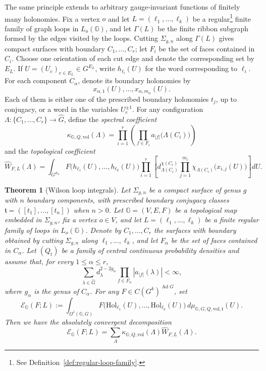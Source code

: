 \documentclass[11pt,a4paper,reqno]{article}
\newtheorem{theorem}{Theorem}[section]
\theoremstyle{definition}
\theoremstyle{remark}
\newcommand\vol{\mathrm{vol}}
\newcommand\Gbb{{\mathbb{G}}}
\newcommand\Hol{{\mathrm{Hol}}}
\begin{document}
The same principle extends to arbitrary gauge-invariant functions of finitely many holonomies. Fix a vertex $o$ and let $L=(\ell_1,\ldots,\ell_k)$ be a regular\footnote{See Definition~\ref{def:regular-loop-family}.} finite family of graph loops in $L_o(\Gbb)$, and let $\Gamma(L)$ be the finite ribbon subgraph formed by the edges visited by the loops. Cutting $\Sigma_{g,n}$ along $\Gamma(L)$ gives compact surfaces with boundary $C_1,\ldots,C_r$; let $F_i$ be the set of faces contained in $C_i$. Choose one orientation of each cut edge and denote the corresponding set by $E_L$. If $U=(U_e)_{e\in E_L}\in G^{E_L}$, write $h_{\ell_i}(U)$ for the word corresponding to $\ell_i$. For each component $C_\alpha$, denote its boundary holonomies by
\[
 x_{\alpha,1}(U),\ldots,x_{\alpha,m_\alpha}(U).
\]
Each of them is either one of the prescribed boundary holonomies $t_j$, up to conjugacy, or a word in the variables $U_e^{\pm1}$. For any configuration $\Lambda:\{C_1,\ldots,C_r\}\to\widehat G$, define the \emph{spectral coefficient}
\begin{equation}\label{eq:spec-coef}
 \kappa_{\Gbb,Q,\vol}(\Lambda)
 =\prod_{i=1}^r\left(\prod_{f\in F_i}a_{|f|}\big(\Lambda(C_i)\big)\right)
\end{equation}
and the \emph{topological coefficient}
\begin{equation}\label{eq:top-coef}
 \widehat W_{F,L}(\Lambda)
 =\int_{G^{E_L}}F\big(h_{\ell_1}(U),\ldots,h_{\ell_k}(U)\big)
 \prod_{i=1}^r\left[d_{\Lambda(C_i)}^{\chi(C_i)}
 \prod_{j=1}^{m_i}\chi_{\Lambda(C_i)}\big(x_{i,j}(U)\big)\right]dU.
\end{equation}

\begin{theorem}[Wilson loop integrals]\label{thm:Fourier_Wilsonloop}
Let $\Sigma_{g,n}$ be a compact surface of genus $g$ with $n$ boundary components, with prescribed boundary conjugacy classes $\mathfrak t=([t_1],\ldots,[t_n])$ when $n>0$. Let $\Gbb=(V,E,F)$ be a topological map embedded in $\Sigma_{g,n}$, fix a vertex $o\in V$, and let $L=(\ell_1,\ldots,\ell_k)$ be a finite regular family of loops in $L_o(\Gbb)$. Denote by $C_1,\ldots,C_r$ the surfaces with boundary obtained by cutting $\Sigma_{g,n}$ along $\ell_1,\ldots,\ell_k$, and let $F_\alpha$ be the set of faces contained in $C_\alpha$. Let $(Q_t)$ be a family of central continuous probability densities and assume that, for every $1\leq\alpha\leq r$,
\begin{equation}\label{eq:component-spectral-summability}
 \sum_{\lambda\in\widehat G}
 d_\lambda^{2-2g_\alpha}
 \prod_{f\in F_\alpha}|a_{|f|}(\lambda)|<\infty,
\end{equation}
where $g_\alpha$ is the genus of $C_\alpha$. For any $F\in C(G^k)^{\operatorname{Ad}G}$, set
\[
 \mathcal E_{\Gbb}(F;L)
 :=\int_{\Omega^1(\Gbb,G)}
 F\bigl(\Hol_{\ell_1}(U),\ldots,\Hol_{\ell_k}(U)\bigr)\,
 d\mu_{\Gbb,G,Q,\vol,\mathfrak t}(U).
\]
Then we have the absolutely convergent decomposition
\begin{equation}\label{eq:decomp_spectrale_WL}
 \mathcal E_{\Gbb}(F;L)
 =\sum_{\Lambda}\kappa_{\Gbb,Q,\vol}(\Lambda)\widehat W_{F,L}(\Lambda).
\end{equation}
\end{theorem}
\end{document}
